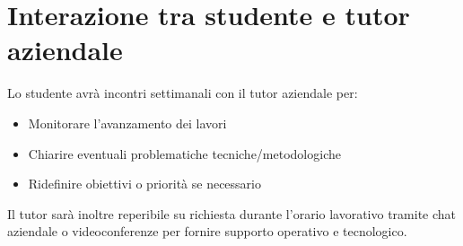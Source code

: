 \section*{Interazione tra studente e tutor aziendale}

Lo studente avrà incontri settimanali con il tutor aziendale per:

\begin{itemize}
 \item Monitorare l’avanzamento dei lavori
 \item Chiarire eventuali problematiche tecniche/metodologiche
 \item Ridefinire obiettivi o priorità se necessario
\end{itemize}

Il tutor sarà inoltre reperibile su richiesta durante l’orario lavorativo tramite chat aziendale o videoconferenze per fornire supporto operativo e tecnologico.